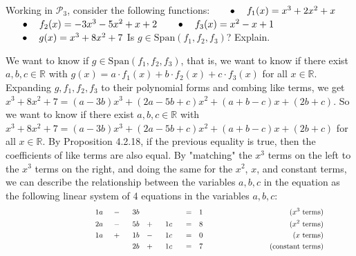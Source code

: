 \documentclass[12pt]{article}
\newenvironment{problem}[2][Problem]
{
	\begin{trivlist} 
		\item[\hskip \labelsep {\bfseries #1 #2:}]
	}
{
	\end{trivlist}
	}
\newenvironment{solution}[1][Solution]
{
	\begin{trivlist} 
		\item[\hskip \labelsep {\itshape #1:}]
	}
	{
	\end{trivlist}
}
\begin{document}
\newpage
\begin{problem}{3}
Working in $\mathcal{P}_3$, consider the following functions:
\newline
\newline
$\hphantom{100} \bullet \hphantom{10} f_1 (x) = x^3 + 2x^2 +x$
\newline
\newline
$\hphantom{100} \bullet \hphantom{10} f_2 (x) = -3x^3 - 5x^2 +x +2$
\newline
\newline
$\hphantom{100} \bullet \hphantom{10} f_3(x) = x^2 - x +1$
\newline
\newline
$\hphantom{100} \bullet \hphantom{10} g(x) = x^3 + 8x^2 +7$
\newline
\newline
\noindent
Is $g \in \text{Span}(f_1,f_2,f_3)$? Explain.
\noindent
\newline
\newline
\begin{solution}
We want to know if $g\in \text{Span}(f_1,f_2,f_3)$, that is, we want to know if there exist $a,b,c \in \mathbb{R}$ with $g(x)=a\cdot f_1(x) + b\cdot f_2(x) + c\cdot f_3(x)$ for all $x\in \mathbb{R}$. Expanding $g,f_1,f_2,f_3$ to their polynomial forms and combing like terms, we get $x^3 + 8x^2 +7 = (a-3b)x^3 + (2a-5b+c)x^2 +(a+b-c)x +(2b+c)$. So we want to know if there exist $a,b,c \in \mathbb{R}$ with $x^3 + 8x^2 +7 = (a-3b)x^3 + (2a-5b+c)x^2 +(a+b-c)x +(2b+c)$ for all $x\in \mathbb{R}$. By Proposition 4.2.18, if the previous equality is true, then the coefficients of like terms are also equal. By "matching" the $x^3$ terms on the left to the $x^3$ terms on the right, and doing the same for the $x^2$, $x$, and constant terms, we can describe the relationship between the variables $a,b,c$ in the equation as the following linear system of 4 equations in the variables $a,b,c$:
\begin{align*}
&&&&&&&& &&&&&&&& &&&&&&&& &1a& &-& &3b& &\hphantom{500}& &\hphantom{500}& &=& &1& &&&&&&&& &&&&&&&& \text{($x^3$ terms)} &&&&&&&& \\
&&&&&&&& &&&&&&&& &&&&&&&& &2a& &-& &5b& &+& &1c& &=& &8& &&&&&&&& &&&&&&&& \text{($x^2$ terms)} &&&&&&&& \\
&&&&&&&& &&&&&&&& &&&&&&&& &1a& &+& &1b& &-& &1c& &=& &0& &&&&&&&& &&&&&&&& \text{($x$ terms)} &&&&&&&& \\
&&&&&&&& &&&&&&&& &&&&&&&& &\hphantom{500}& &\hphantom{500}& &2b& &+& &1c& &=& &7& &&&&&&&& &&&&&&&& \text{(constant terms)} &&&&&&&& 

\end{align*}
\end{solution}
\end{problem}
\end{document}

